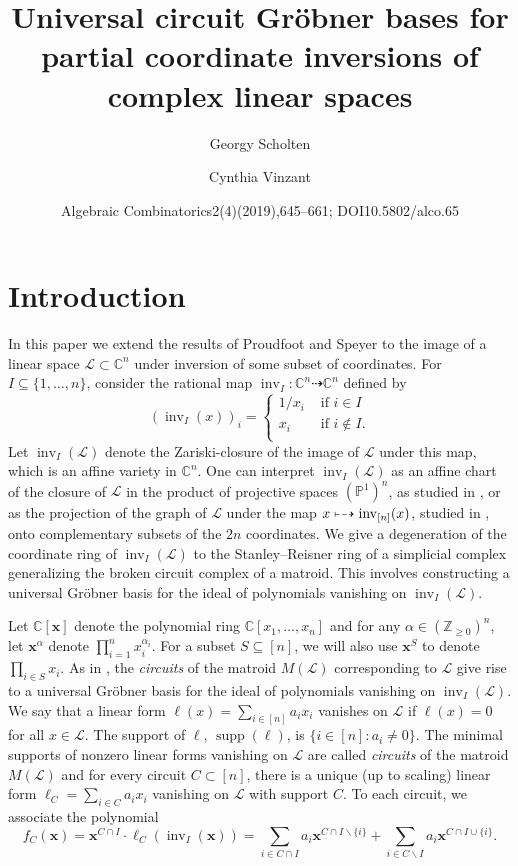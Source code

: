 \documentclass[10pt]{amsart}
\title[Universal circuit bases for partial inversion]{Universal circuit Gr\"obner bases for partial coordinate inversions of complex linear spaces}
\author{Georgy Scholten}
\author{Cynthia Vinzant}
\date{Algebraic Combinatorics2(4)(2019),645–661; DOI10.5802/alco.65}
\theoremstyle{definition}
\newcommand{\PP}{\mathbb{P}}
\newcommand{\Z}{\mathbb{Z}}
\newcommand{\Cbb}{\mathbb{C}}
\newcommand{\cL}{\mathcal{L}}
\newcommand{\x}{\mathbf{x}}
\DeclareMathOperator{\inv}{inv}
\DeclareMathOperator{\supp}{supp}
\def\dashmapsto{\mapstochar\dashrightarrow}
\begin{document}
\maketitle
\section{Introduction}
In this paper we extend the results of Proudfoot and Speyer to the image of a linear space $\cL\subset \Cbb^n$ under inversion of some subset of coordinates.
For $I\subseteq \{1,\ldots , n\}$, consider the rational map $\inv_I: \Cbb^n \dashrightarrow \Cbb^n $ defined by 
\[(\inv_I(x))_i =
\begin{cases}
1/x_i &\text{ if } i\in I\\
x_i &\text{ if } i\not\in I.\\
\end{cases}
\]
Let $\inv_I(\cL)$ denote the Zariski-closure of the image of $\cL$ under this map, which is an affine variety in $\Cbb^n$. One can interpret $\inv_I(\cL)$ as 
an affine chart of the closure of $\cL$ in the product of projective spaces $(\PP^1)^n$, as studied in \cite{AB16}, or as the projection 
of the graph of $\cL$ under the map $x\dashmapsto \inv_{[n]}(x)$, studied in \cite{FSW17}, onto complementary subsets of the $2n$ coordinates. 
We give a degeneration of the coordinate ring of $\inv_I(\cL)$
to the Stanley--Reisner ring of a simplicial complex generalizing the broken circuit complex of a matroid. 
This involves constructing a universal Gr\"obner basis for the ideal of polynomials vanishing on $\inv_I(\cL)$.

Let $\Cbb[\x]$ denote the polynomial ring $\Cbb[x_1, \ldots ,x_n]$ and for any $\alpha \in (\Z_{\geq 0})^n$, let 
$\x^{\alpha}$ denote $\prod_{i=1}^n x_i^{\alpha_i}$. For a subset $S\subseteq[n]$, we will also use $\x^S$ to denote $\prod_{i\in S}x_i$. 
As in \cite{PS}, the \emph{circuits} of the matroid $M(\cL)$ corresponding to $\cL$ give rise to a universal Gr\"obner basis for the 
ideal of polynomials vanishing on $\inv_I(\cL)$. 
We say that a linear form $\ell(x)= \sum_{i\in [n]} a_i x_i$ vanishes on $\cL$ if $\ell(x) = 0$ for all $x\in \cL$. 
The support of $\ell$, $\supp(\ell)$, is $\{i\in [n] : a_i\neq 0\}$. The minimal supports of nonzero linear forms vanishing on $\cL$
are called \emph{circuits} of the matroid $M(\cL)$ and for every circuit $C\subset [n]$, there is a unique (up to scaling) 
linear form $\ell_C= \sum_{i\in C} a_i x_i$ vanishing on $\cL$ with support $C$. To each circuit, we associate the polynomial 
\begin{equation}\label{eq:fC_def}
f_C(\x) = \x^{C\cap I} \cdot \ell_C(\inv_I(\x)) = \sum_{i\in C\cap I} a_i \x^{C\cap I\backslash\{ i\}} + \sum_{i\in C\backslash I } a_i \x^{C\cap I \cup\{ i\}}.
\end{equation}
\end{document}

